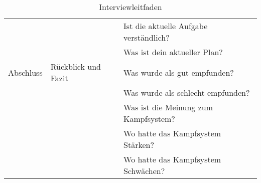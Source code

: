 \begin{table}[h]
\begin{center}
\begin{tabularx}{\textwidth}{l|l|X}
			               &                     & Ist die aktuelle Aufgabe verständlich?                                  \\
			               &                     & Was ist dein aktueller Plan?
			\newline                                                                                                       \\
			Abschluss      & Rückblick und Fazit & Was wurde als gut empfunden?                                            \\
			               &                     & Was wurde als schlecht empfunden?                                       \\
			               &                     & Was ist die Meinung zum Kampfsystem?                                    \\
			               &                     & Wo hatte das Kampfsystem Stärken?                                       \\
			               &                     & Wo hatte das Kampfsystem Schwächen?
		\end{tabularx}
		\caption{Interviewleitfaden}
		\label{table:interview-guideline}
	\end{center}
\end{table}
